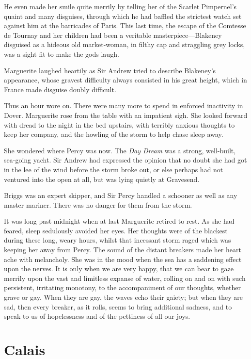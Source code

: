 \documentclass[paper=5.5in:8.5in,BCOR=7mm,twoside,DIV=calc,12pt,usegeometry,chapterprefix,endperiod,headings=big]{scrbook}
\begin{document}
He even made her smile quite merrily by telling her of the Scarlet Pimpernel's quaint and many disguises, through which he had baffled the strictest watch set against him at the barricades of Paris. This last time, the escape of the Comtesse de Tournay and her children had been a veritable masterpiece---Blakeney disguised as a hideous old market-woman, in filthy cap and straggling grey locks, was a sight fit to make the gods laugh.

Marguerite laughed heartily as Sir Andrew tried to describe Blakeney's appearance, whose gravest difficulty always consisted in his great height, which in France made disguise doubly difficult.

Thus an hour wore on. There were many more to spend in enforced inactivity in Dover. Marguerite rose from the table with an impatient sigh. She looked forward with dread to the night in the bed upstairs, with terribly anxious thoughts to keep her company, and the howling of the storm to help chase sleep away.

She wondered where Percy was now. The \textit{Day Dream} was a strong, well-built, sea-going yacht. Sir Andrew had expressed the opinion that no doubt she had got in the lee of the wind before the storm broke out, or else perhaps had not ventured into the open at all, but was lying quietly at Gravesend.

Briggs was an expert skipper, and Sir Percy handled a schooner as well as any master mariner. There was no danger for them from the storm.

It was long past midnight when at last Marguerite retired to rest. As she had feared, sleep sedulously avoided her eyes. Her thoughts were of the blackest during these long, weary hours, whilst that incessant storm raged which was keeping her away from Percy. The sound of the distant breakers made her heart ache with melancholy. She was in the mood when the sea has a saddening effect upon the nerves. It is only when we are very happy, that we can bear to gaze merrily upon the vast and limitless expanse of water, rolling on and on with such persistent, irritating monotony, to the accompaniment of our thoughts, whether grave or gay. When they are gay, the waves echo their gaiety; but when they are sad, then every breaker, as it rolls, seems to bring additional sadness, and to speak to us of hopelessness and of the pettiness of all our joys.

\chapter{Calais}
\end{document}
